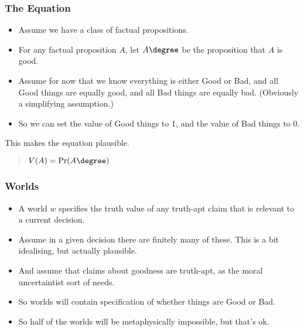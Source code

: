 \begin{frame}[fragile]
\frametitle{The Equation}
\label{theequation}

\begin{itemize}
\item{} Assume we have a class of factual propositions.

\item{} For any factual proposition $A$, let $A\degree$ be the proposition that $A$ is good. \pause 

\item{} Assume for now that we know everything is either Good or Bad, and all Good things are equally good, and all Bad things are equally bad. (Obviously a simplifying assumption.)

\item{} So we can set the value of Good things to 1, and the value of Bad things to 0. \pause 

\end{itemize}

This makes the equation plausible.

\begin{quote}
$V(A) = \Pr(A\degree)$
\end{quote}

\end{frame}

\begin{frame}[fragile]
\frametitle{Worlds}
\label{worlds}

\begin{itemize}
\item{} A world $w$ specifies the truth value of any truth-apt claim that is relevant to a current decision.

\item{} Assume in a given decision there are finitely many of these. This is a bit idealising, but actually plausible.

\item{} And assume that claims about goodness are truth-apt, as the moral uncertaintist sort of needs.

\item{} So worlds will contain specification of whether things are Good or Bad.

\item{} So half of the worlds will be metaphysically impossible, but that's ok.

\end{itemize}

\end{frame}

